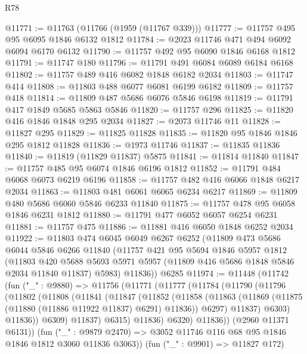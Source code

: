\begin{lexlean}{R78}
\begin{coremodule}
@11771 := @11763 (@11766 (@1959 (@11767 @339)))
@11777 := @11757 @495 @95 @6095 @1846 @6132 @1812
@11784 := @2023 @11746 @471 @494 @6092 @6094 @6170 @6132
@11790 := @11757 @492 @95 @6090 @1846 @6168 @1812
@11791 := @11747 @180
@11796 := @11791 @491 @6084 @6089 @6184 @6168
@11802 := @11757 @489 @416 @6082 @1848 @6182 @2034
@11803 := @11747 @414
@11808 := @11803 @488 @6077 @6081 @6199 @6182
@11809 := @11757 @418
@11814 := @11809 @487 @5686 @6076 @5846 @6198
@11819 := @11791 @417 @1849 @5685 @5863 @5846
@11820 := @11757 @296
@11825 := @11820 @416 @1846 @1848 @295 @2034
@11827 := @2073 @11746 @11
@11828 := @11827 @295
@11829 := @11825 @11828
@11835 := @11820 @95 @1846 @1846 @295 @1812 @11828
@11836 := @1973 @11746
@11837 := @11835 @11836
@11840 := @11819 (@11829 @11837) @5875
@11841 := @11814 @11840
@11847 := @11757 @485 @95 @6074 @1846 @6196 @1812
@11852 := @11791 @484 @6068 @6073 @6219 @6196
@11858 := @11757 @482 @416 @6066 @1848 @6217 @2034
@11863 := @11803 @481 @6061 @6065 @6234 @6217
@11869 := @11809 @480 @5686 @6060 @5846 @6233 @11840
@11875 := @11757 @478 @95 @6058 @1846 @6231 @1812
@11880 := @11791 @477 @6052 @6057 @6254 @6231
@11881 := @11757 @475
@11886 := @11881 @416 @6050 @1848 @6252 @2034
@11922 := @11803
    @474
    @6045
    @6049
    @6267
    @6252
    (@11809
      @473
      @5686
      @6044
      @5846
      @6266
      @11840
      (@11757
        @421
        @95
        @5694
        @1846
        @5957
        @1812
        (@11803
          @420
          @5688
          @5693
          @5971
          @5957
          (@11809 @416 @5686 @1848 @5846 @2034 @11840 @11837)
          @5983)
        @11836))
    @6285
@11974 := @11448
    (@11742
      (fun ("_" : @9880) =>
      @11756
        (@11771
          (@11777
            (@11784
              (@11790
                (@11796
                  (@11802
                    (@11808
                      (@11841
                        (@11847
                          (@11852
                            (@11858
                              (@11863
                                (@11869 (@11875 (@11880 (@11886 @11922 @11837) @6291) @11836))
                                @6297)
                              @11837)
                            @6303)
                          @11836))
                      @6309)
                    @11837)
                  @6315)
                @11836)
              @6320)
            @11836))
        (@2960 @11371 @6131))
      (fun ("_" : @9879 @2470) => @3052 @11746 @116 @68 @95 @1846 @1846 @1812 @3060 @11836 @3063))
    (fun ("_" : @9901) => @11827 @172)

\end{coremodule}
\end{lexlean}
